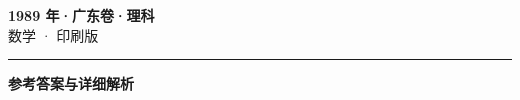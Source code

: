 \documentclass[zihao=5, a4paper]{ctexart}
\begin{document}
\begin{center}
  {\Large\bfseries 1989 年·广东卷·理科}\\[4pt]
  {\large 数学 · 印刷版}
\end{center}
\medskip
{}

\par\bigskip\hrule\bigskip
{}
\begin{center}{\large\bfseries 参考答案与详细解析}\end{center}
\smallskip

\end{document}
